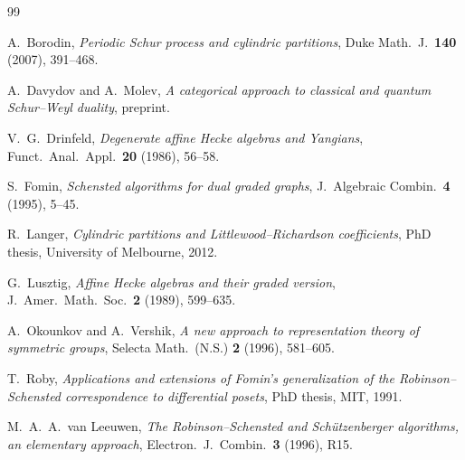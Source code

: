 \documentclass[12pt,a4paper]{article}
\theoremstyle{definition}
\theoremstyle{remark}
\begin{document}
\begin{thebibliography}{99}

A.~Borodin,
\emph{Periodic Schur process and cylindric partitions},
Duke Math.\ J.\ \textbf{140} (2007), 391--468.

A.~Davydov and A.~Molev,
\emph{A categorical approach to classical and quantum Schur--Weyl
duality},
preprint.

V.~G.~Drinfeld,
\emph{Degenerate affine Hecke algebras and Yangians},
Funct.\ Anal.\ Appl.\ \textbf{20} (1986), 56--58.

S.~Fomin,
\emph{Schensted algorithms for dual graded graphs},
J.\ Algebraic Combin.\ \textbf{4} (1995), 5--45.

R.~Langer,
\emph{Cylindric partitions and Littlewood--Richardson coefficients},
PhD thesis, University of Melbourne, 2012.

G.~Lusztig,
\emph{Affine Hecke algebras and their graded version},
J.\ Amer.\ Math.\ Soc.\ \textbf{2} (1989), 599--635.

A.~Okounkov and A.~Vershik,
\emph{A new approach to representation theory of symmetric groups},
Selecta Math.\ (N.S.) \textbf{2} (1996), 581--605.

T.~Roby,
\emph{Applications and extensions of Fomin's generalization of the
Robinson--Schensted correspondence to differential posets},
PhD thesis, MIT, 1991.

M.~A.~A.~van Leeuwen,
\emph{The Robinson--Schensted and Sch\"utzenberger algorithms, an
elementary approach},
Electron.\ J.\ Combin.\ \textbf{3} (1996), R15.

\end{thebibliography}
\end{document}
